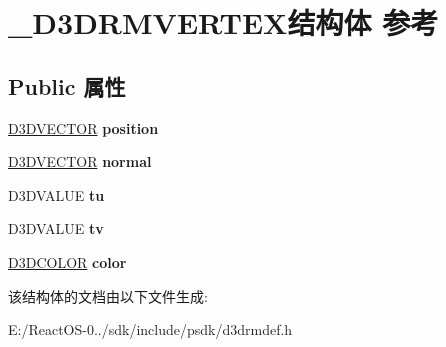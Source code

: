 \hypertarget{struct___d3_d_r_m_v_e_r_t_e_x}{}\section{\+\_\+\+D3\+D\+R\+M\+V\+E\+R\+T\+E\+X结构体 参考}
\label{struct___d3_d_r_m_v_e_r_t_e_x}
\subsection*{Public 属性}
\begin{DoxyCompactItemize}
\item 
\mbox{\label{struct___d3_d_r_m_v_e_r_t_e_x_af5c3ca8acb0ecb3b2f89a2f1d95ffb83}} 
\hyperlink{struct___d3_d_v_e_c_t_o_r}{D3\+D\+V\+E\+C\+T\+OR} {\bfseries position}
\item 
\mbox{\label{struct___d3_d_r_m_v_e_r_t_e_x_a0107a0c655bc9fb4762106619e3eb80e}} 
\hyperlink{struct___d3_d_v_e_c_t_o_r}{D3\+D\+V\+E\+C\+T\+OR} {\bfseries normal}
\item 
\mbox{\label{struct___d3_d_r_m_v_e_r_t_e_x_a324974ac76c0b5bc50cd07dfb2245523}} 
D3\+D\+V\+A\+L\+UE {\bfseries tu}
\item 
\mbox{\label{struct___d3_d_r_m_v_e_r_t_e_x_a26dde49d1c6473438da2cde937e303a1}} 
D3\+D\+V\+A\+L\+UE {\bfseries tv}
\item 
\mbox{\label{struct___d3_d_r_m_v_e_r_t_e_x_af799e192ea189174f5ccf20c4732ac63}} 
\hyperlink{struct_d3_d_c_o_l_o_r}{D3\+D\+C\+O\+L\+OR} {\bfseries color}
\end{DoxyCompactItemize}


该结构体的文档由以下文件生成\+:\begin{DoxyCompactItemize}
\item 
E\+:/\+React\+O\+S-\/0../sdk/include/psdk/d3drmdef.\+h\end{DoxyCompactItemize}
